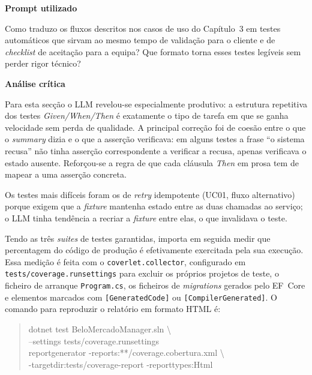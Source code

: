    \begin{tcolorbox}[title=Interação com o LLM]
    \textbf{Prompt utilizado}

    Como traduzo os fluxos descritos nos casos de uso do Capítulo~3 em testes automáticos que sirvam ao mesmo tempo de validação para o cliente e de \textit{checklist} de aceitação para a equipa? Que formato torna esses testes legíveis sem perder rigor técnico?

    \tcblower

    \textbf{Análise crítica}

    Para esta secção o LLM revelou-se especialmente produtivo: a estrutura repetitiva dos testes \textit{Given/When/Then} é exatamente o tipo de tarefa em que se ganha velocidade sem perda de qualidade. A principal correção foi de coesão entre o que o \textit{summary} dizia e o que a asserção verificava: em alguns testes a frase ``o sistema recusa'' não tinha asserção correspondente a verificar a recusa, apenas verificava o estado ausente. Reforçou-se a regra de que cada cláusula \textit{Then} em prosa tem de mapear a uma asserção concreta.

    Os testes mais difíceis foram os de \textit{retry} idempotente (UC01, fluxo alternativo) porque exigem que a \textit{fixture} mantenha estado entre as duas chamadas ao serviço; o LLM tinha tendência a recriar a \textit{fixture} entre elas, o que invalidava o teste.
    \end{tcolorbox}

    Tendo as três \textit{suites} de testes garantidas, importa em seguida medir que percentagem do código de produção é efetivamente exercitada pela sua execução. Essa medição é feita com o \texttt{coverlet.collector}, configurado em \texttt{tests/coverage.runsettings} para excluir os próprios projetos de teste, o ficheiro de arranque \texttt{Program.cs}, os ficheiros de \textit{migrations} gerados pelo EF~Core e elementos marcados com \texttt{[GeneratedCode]} ou \texttt{[CompilerGenerated]}. O comando para reproduzir o relatório em formato HTML é:

    \begin{quote}\ttfamily\small
    dotnet test BeloMercadoManager.sln \textbackslash\\
    \hspace*{2em}--settings tests/coverage.runsettings\\
    reportgenerator -reports:**/coverage.cobertura.xml \textbackslash\\
    \hspace*{2em}-targetdir:tests/coverage-report -reporttypes:Html
    \end{quote}

